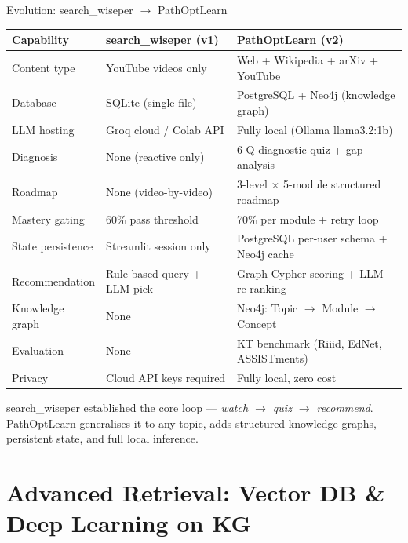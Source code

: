 \documentclass[aspectratio=169,9pt]{beamer}
\begin{document}
\begin{frame}{Evolution: search\_wiseper $\to$ PathOptLearn}
\small
\begin{tabularx}{\textwidth}{@{}lXX@{}}
  \toprule
  \textbf{Capability} & \textbf{search\_wiseper (v1)} & \textbf{PathOptLearn (v2)} \\
  \midrule
  Content type        & YouTube videos only           & Web + Wikipedia + arXiv + YouTube \\
  Database            & SQLite (single file)          & PostgreSQL + Neo4j (knowledge graph) \\
  LLM hosting         & Groq cloud / Colab API        & Fully local (Ollama llama3.2:1b) \\
  Diagnosis           & None (reactive only)          & 6-Q diagnostic quiz + gap analysis \\
  Roadmap             & None (video-by-video)         & 3-level $\times$ 5-module structured roadmap \\
  Mastery gating      & 60\% pass threshold           & 70\% per module + retry loop \\
  State persistence   & Streamlit session only        & PostgreSQL per-user schema + Neo4j cache \\
  Recommendation      & Rule-based query + LLM pick   & Graph Cypher scoring + LLM re-ranking \\
  Knowledge graph     & None                          & Neo4j: Topic $\to$ Module $\to$ Concept \\
  Evaluation          & None                          & KT benchmark (Riiid, EdNet, ASSISTments) \\
  Privacy             & Cloud API keys required       & Fully local, zero cost \\
  \bottomrule
\end{tabularx}

\vspace{0.2cm}
\begin{resultbox}
  search\_wiseper established the core loop — \emph{watch $\to$ quiz $\to$ recommend}. PathOptLearn generalises it to any topic, adds structured knowledge graphs, persistent state, and full local inference.
\end{resultbox}
\end{frame}

\section{Advanced Retrieval: Vector DB \& Deep Learning on KG}
\end{document}
